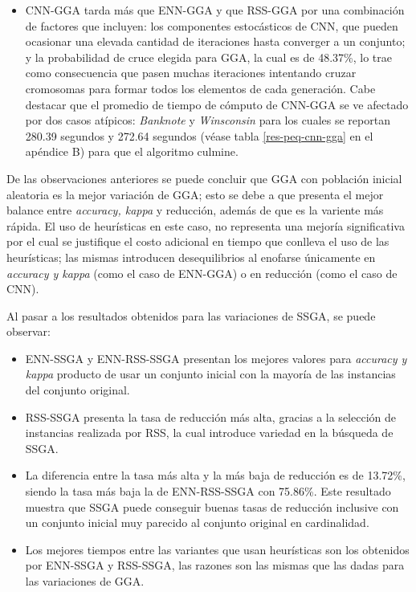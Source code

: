 \begin{itemize}
\item CNN-GGA tarda más que ENN-GGA y que RSS-GGA por una combinación de factores que incluyen: los componentes estocásticos de CNN, que pueden ocasionar una elevada cantidad de iteraciones hasta converger a un conjunto; y la probabilidad de cruce elegida para GGA, la cual es de 48.37\%, lo trae como consecuencia que pasen muchas iteraciones intentando cruzar cromosomas para formar todos los elementos de cada generación. Cabe destacar que el promedio de tiempo de cómputo de CNN-GGA se ve afectado por dos casos atípicos: \emph{Banknote} y \emph{Winsconsin} para los cuales se reportan 280.39 segundos y 272.64 segundos (véase tabla \ref{res-peq-cnn-gga} en el apéndice B) para que el algoritmo culmine.

\end{itemize}

De las observaciones anteriores se puede concluir que GGA con población inicial aleatoria es la mejor variación de GGA; esto se debe a que presenta el mejor balance entre \emph{accuracy, kappa} y reducción, además de que es la variente más rápida. El uso de heurísticas en este caso, no representa una mejoría significativa por el cual se justifique el costo adicional en tiempo que conlleva el uso de las heurísticas; las mismas introducen desequilibrios al enofarse únicamente en \emph{accuracy y kappa} (como el caso de ENN-GGA) o en reducción (como el caso de CNN).

Al pasar a los resultados obtenidos para las variaciones de SSGA, se puede observar:

\begin{itemize}

\item ENN-SSGA y ENN-RSS-SSGA presentan los mejores valores para \emph{accuracy y kappa} producto de usar un conjunto inicial con la mayoría de las instancias del conjunto original.

\item RSS-SSGA presenta la tasa de reducción más alta, gracias a la selección de instancias realizada por RSS, la cual introduce variedad en la búsqueda de SSGA.

\item La diferencia entre la tasa más alta y la más baja de reducción es de 13.72\%, siendo la tasa más baja la de ENN-RSS-SSGA con 75.86\%. Este resultado muestra que SSGA puede conseguir buenas tasas de reducción inclusive con un conjunto inicial muy parecido al conjunto original en cardinalidad.

\item Los mejores tiempos entre las variantes que usan heurísticas son los obtenidos por ENN-SSGA y RSS-SSGA, las razones son las mismas que las dadas para las variaciones de GGA. 

\end{itemize}

